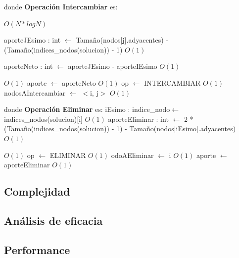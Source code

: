\documentclass[a4paper, 10pt, twoside]{article}
\newenvironment{pseudo}[1][]{%
    \vspace{1em}%
    \begin{algorithmic}%
}
{%
    \end{algorithmic}%
    \vspace{1em}%
}
\newcommand{\Ode}[1]{\hfill $O(#1)$}
\begin{document}
\begin{pseudo}
\State
\State donde \textbf{Operación Intercambiar} es:
\State

											\Ode{N*log N}

					\State aporteJEsimo : int $\leftarrow$ Tamaño(nodos[j].adyacentes) -
					\State (Tamaño(indices\_nodos(solucion)) - 1)															\Ode{1}

					\State aporteNeto : int $\leftarrow$ aporteJEsimo - aporteIEsimo										\Ode{1}

																									\Ode{1}
						\State aporte $\leftarrow$ aporteNeto																\Ode{1}
						\State op $\leftarrow$ INTERCAMBIAR 																\Ode{1}
						\State nodosAIntercambiar $\leftarrow$ $<$i, j$>$ 													\Ode{1}
					\EndIf
				\EndIf
			\EndFor	

\State
\State donde \textbf{Operación Eliminar} es:
\State
			\State iEsimo : indice\_nodo$\leftarrow$ indices\_nodos(solucion)[i]											\Ode{1}
			\State aporteEliminar : int $\leftarrow$ 2 * (Tamaño(indices\_nodos(solucion)) - 1) - 
			\State Tamaño(nodos[iEsimo].adyacentes)																			\Ode{1}

																								\Ode{1}
				\State op $\leftarrow$ ELIMINAR 																			\Ode{1}
				\State odoAEliminar $\leftarrow$ i 																			\Ode{1}
				\State aporte $\leftarrow$ aporteEliminar 																	\Ode{1}
			\EndIf
		\EndFor


\end{pseudo}

\subsection{Complejidad}
\subsection{Análisis de eficacia}

\subsection{Performance}

\end{document}
